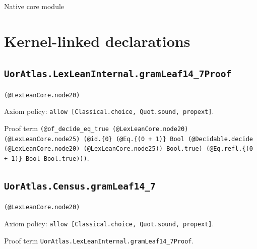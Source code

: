 \documentclass[11pt]{article}
\begin{document}
\begin{center}{\LARGE Native core module}\end{center}
\section*{Kernel-linked declarations}
\subsection*{\texttt{UorAtlas.LexLeanInternal.gramLeaf14\_7Proof}}
\noindent\texttt{(@LexLeanCore.node20)}\par
\noindent Axiom policy: \texttt{allow [Classical.choice, Quot.sound, propext]}.\par
\noindent Proof term \texttt{(@of\_decide\_eq\_true (@LexLeanCore.node20) (@LexLeanCore.node25) (@id.\{0\} (@Eq.\{(0 + 1)\} Bool (@Decidable.decide (@LexLeanCore.node20) (@LexLeanCore.node25)) Bool.true) (@Eq.refl.\{(0 + 1)\} Bool Bool.true)))}.\par
\subsection*{\texttt{UorAtlas.Census.gramLeaf14\_7}}
\noindent\texttt{(@LexLeanCore.node20)}\par
\noindent Axiom policy: \texttt{allow [Classical.choice, Quot.sound, propext]}.\par
\noindent Proof term \texttt{UorAtlas.LexLeanInternal.gramLeaf14\_7Proof}.\par
\end{document}
